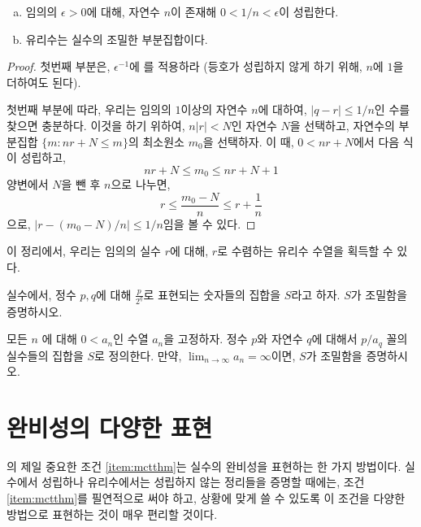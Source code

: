 \begin{theorem}
\label{thm:ratdense}
    \begin{enumerate}[(a)]
        \item 임의의 $\epsilon > 0$에 대해, 자연수 $n$이 존재해 $0 < 1/n < \epsilon$이 성립한다.
        \item 유리수는 실수의 조밀한 부분집합이다.
    \end{enumerate}
\end{theorem}
\begin{proof}
    첫번째 부분은, $\epsilon^{-1}$에 를 적용하라 (등호가 성립하지 않게 하기 위해, $n$에 $1$을 더하여도 된다).

    첫번째 부분에 따라, 우리는 임의의 $1$이상의 자연수 $n$에 대하여, $|q - r| \leq 1/n$인 수를 찾으면 충분하다.
    이것을 하기 위하여, $n|r| < N$인 자연수 $N$을 선택하고, 자연수의 부분집합 $\{m: nr + N \leq m\}$의 최소원소 $m_0$을 선택하자.
    이 때, $0 < nr + N$에서 다음 식이 성립하고,
    \begin{equation*}
        nr + N \leq m_0 \leq nr + N + 1
    \end{equation*}
    양변에서 $N$을 뺀 후 $n$으로 나누면,
    \begin{equation*}
        r \leq \frac{m_0 - N}{n} \leq r + \frac{1}{n}
    \end{equation*}
    으로, $|r - (m_0 - N)/n| \leq 1/n$임을 볼 수 있다.
\end{proof}
이 정리에서, 우리는 임의의 실수 $r$에 대해, $r$로 수렴하는 유리수 수열을 획득할 수 있다.

\begin{exercise}
    실수에서, 정수 $p, q$에 대해 $\frac{p}{2^q}$로 표현되는 숫자들의 집합을 $S$라고 하자.
    $S$가 조밀함을 증명하시오.
\end{exercise}
\begin{exercise}
    모든 $n$ 에 대해 $0 < a_n$인 수열 $a_n$을 고정하자.
    정수 $p$와 자연수 $q$에 대해서 $p/a_q$ 꼴의 실수들의 집합을 $S$로 정의한다.
    만약, $\lim_{n \to \infty} a_n = \infty$이면, $S$가 조밀함을 증명하시오.
\end{exercise}

\section{완비성의 다양한 표현}
의 제일 중요한 조건 \ref{item:mctthm}는 실수의 완비성을 표현하는 한 가지 방법이다.
실수에서 성립하나 유리수에서는 성립하지 않는 정리들을 증명할 때에는, 조건 \ref{item:mctthm}를 필연적으로 써야 하고, 상황에 맞게 쓸 수 있도록 이 조건을 다양한 방법으로 표현하는 것이 매우 편리할 것이다.


